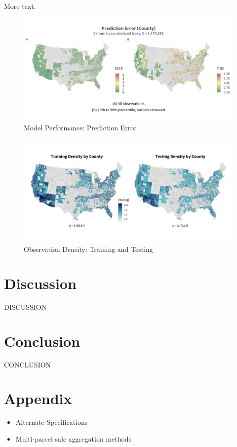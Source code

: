 \documentclass[12pt]{article}
\begin{document}
More text.

\begin{figure}
    \centering
    \includegraphics[width=6in]{figures/rf_mse_map.png}
    \caption{Model Performance: Prediction Error}
    \label{fig:mse_county}
\end{figure}

\newpage

\begin{figure}
    \centering
    \includegraphics[width=6in]{figures/test_train_density.png}
    \caption{Observation Density: Training and Testing}
    \label{fig:train_test}
\end{figure}

\newpage

\section{Discussion}

DISCUSSION

\newpage

\section{Conclusion}

CONCLUSION

\newpage

\section{Appendix}

\begin{itemize}
    \item Alternate Specifications
    \item Multi-parcel sale aggregation methods
\end{itemize}


\newpage


\printbibliography
\end{document}
